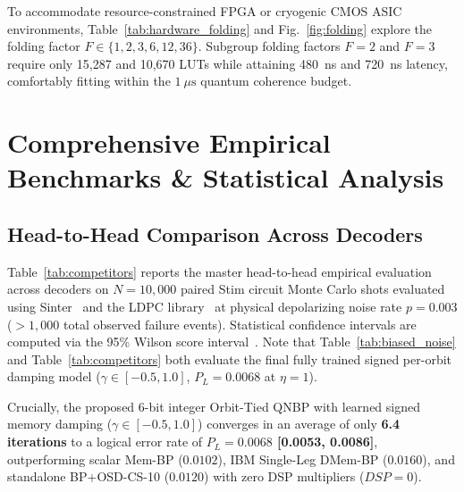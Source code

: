 \documentclass[journal]{IEEEtran}
\begin{document}
To accommodate resource-constrained FPGA or cryogenic CMOS ASIC environments, Table~\ref{tab:hardware_folding} and Fig.~\ref{fig:folding} explore the folding factor $F \in \{1, 2, 3, 6, 12, 36\}$. Subgroup folding factors $F=2$ and $F=3$ require only 15,287 and 10,670 LUTs while attaining 480~ns and 720~ns latency, comfortably fitting within the $1~\mu\text{s}$ quantum coherence budget.

\section{Comprehensive Empirical Benchmarks \& Statistical Analysis}



\subsection{Head-to-Head Comparison Across Decoders}
Table~\ref{tab:competitors} reports the master head-to-head empirical evaluation across decoders on $N=10,000$ paired Stim circuit Monte Carlo shots evaluated using Sinter~\cite{gidney2021sinter} and the LDPC library~\cite{roffe2022ldpc,ibm2025relaybp} at physical depolarizing noise rate $p = 0.003$ ($>1,000$ total observed failure events). Statistical confidence intervals are computed via the 95\% Wilson score interval~\cite{wilson1927probable}. Note that Table~\ref{tab:biased_noise} and Table~\ref{tab:competitors} both evaluate the final fully trained signed per-orbit damping model ($\gamma \in [-0.5, 1.0]$, $P_L = 0.0068$ at $\eta = 1$).

Crucially, the proposed 6-bit integer Orbit-Tied QNBP with learned signed memory damping ($\gamma \in [-0.5, 1.0]$) converges in an average of only \textbf{6.4 iterations} to a logical error rate of \textbf{$P_L = 0.0068$ [0.0053, 0.0086]}, outperforming scalar Mem-BP ($0.0102$), IBM Single-Leg DMem-BP ($0.0160$), and standalone BP+OSD-CS-10 ($0.0120$) with zero DSP multipliers ($DSP=0$).
\end{document}
